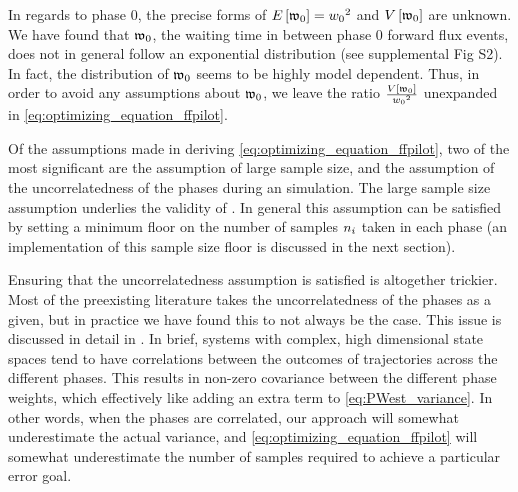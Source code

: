 In regards to phase 0, the precise forms of $E \left[ \mathfrak{w}_{0} \right] = w_{0} {}^2$ and $V \left[ \mathfrak{w}_{0} \right]$ are unknown. We have found that $\mathfrak{w}_{0}$, the waiting time in between phase 0 forward flux events, does not in general follow an exponential distribution (see supplemental Fig S2). In fact, the distribution of $\mathfrak{w}_{0}$ seems to be highly model dependent. Thus, in order to avoid any assumptions about $\mathfrak{w}_{0}$, we leave the ratio $\frac{V \left[ \mathfrak{w}_{0} \right]}{w_{0} {}^2}$ unexpanded in \eqref{eq:optimizing_equation_ffpilot}.

Of the assumptions made in deriving \eqref{eq:optimizing_equation_ffpilot}, two of the most significant are the assumption of large sample size, and the assumption of the uncorrelatedness of the phases during an  simulation. The large sample size assumption underlies the validity of . In general this assumption can be satisfied by setting a minimum floor on the number of samples $n_{i}$ taken in each phase (an implementation of this sample size floor is discussed in the next section). 

Ensuring that the uncorrelatedness assumption is satisfied is altogether trickier. Most of the preexisting  literature takes the uncorrelatedness of the phases as a given\supercite{Allen:2006ch,Borrero:2008il,Becker:2012fl}, but in practice we have found this to not always be the case. This issue is discussed in detail in . In brief, systems with complex, high dimensional state spaces tend to have correlations between the outcomes of trajectories across the different phases. This results in non-zero covariance between the different phase weights, which effectively like adding an extra term to \eqref{eq:PWest_variance}. In other words, when the phases are correlated, our approach will somewhat underestimate the actual variance, and \eqref{eq:optimizing_equation_ffpilot} will somewhat underestimate the number of samples required to achieve a particular error goal.

